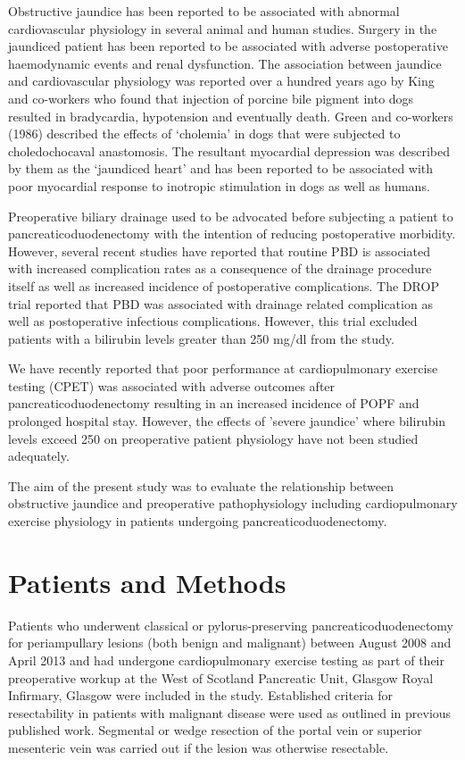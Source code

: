 Obstructive jaundice has been reported to be associated with abnormal cardiovascular physiology in several animal and human studies. Surgery in the jaundiced patient has been reported to be associated with adverse postoperative haemodynamic events and renal dysfunction.\parencite{pain_perioperative_1985,green_systemic_1995} The association between jaundice and cardiovascular physiology was reported over a hundred years ago by King and co-workers who found that injection of porcine bile pigment into dogs resulted in bradycardia, hypotension and eventually death.\parencite{king_effect_1909} Green and co-workers (1986) described the effects of ‘cholemia' in dogs that were subjected to choledochocaval anastomosis. The resultant myocardial depression was described by them as the ‘jaundiced heart'\parencite{green_jaundiced_1986} and has been reported to be associated with poor myocardial response to inotropic stimulation in dogs\parencite{binah_obstructive_1985, bomzon_systemic_1986} as well as humans.\parencite{lumlertgul_jaundiced_1991}

Preoperative biliary drainage used to be advocated before subjecting a patient to pancreaticoduodenectomy with the intention of reducing postoperative morbidity. However, several recent studies have reported that routine PBD is associated with increased complication rates as a consequence of the drainage procedure itself as well as increased incidence of postoperative complications. The DROP trial reported that PBD was associated with drainage related complication as well as postoperative infectious complications. However, this trial excluded patients with a bilirubin levels greater than 250 mg/dl from the study. 

We have recently reported that poor performance at cardiopulmonary exercise testing (CPET) was associated with adverse outcomes after pancreaticoduodenectomy resulting in an increased incidence of POPF and prolonged hospital stay. However, the effects of 'severe jaundice' where bilirubin levels exceed 250 on preoperative patient physiology have not been studied adequately. 

The aim of the present study was to evaluate the relationship between obstructive jaundice and preoperative pathophysiology including cardiopulmonary exercise physiology in patients undergoing pancreaticoduodenectomy.

\clearpage

\section{Patients and Methods}
Patients who underwent classical or pylorus-preserving pancreaticoduodenectomy for periampullary lesions (both benign and malignant) between August 2008 and April 2013 and had undergone cardiopulmonary exercise testing as part of their preoperative workup at the West of Scotland Pancreatic Unit, Glasgow Royal Infirmary, Glasgow were included in the study. Established criteria for resectability in patients with malignant disease were used as outlined in previous published work. Segmental or wedge resection of the portal vein or superior mesenteric vein was carried out if the lesion was otherwise resectable.

